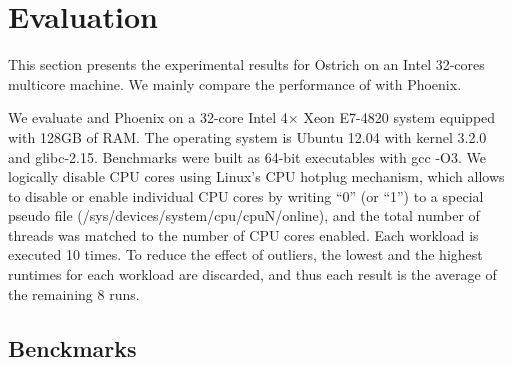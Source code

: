 \section{Evaluation}
This section presents the experimental results for Ostrich on an Intel 32-cores multicore machine. 
We mainly compare the performance of \myds with Phoenix.

We evaluate \myds and Phoenix on a 32-core Intel 4× Xeon E7-4820 system equipped with 128GB of RAM. 
The operating system is Ubuntu 12.04 with kernel 3.2.0 and glibc-2.15.
Benchmarks were built as 64-bit executables with gcc -O3.
We logically disable CPU cores using Linux’s CPU hotplug mechanism, which allows to disable or enable individual CPU cores by writing “0” (or “1”) to a special pseudo file (/sys/devices/system/cpu/cpuN/online), and the total number of threads was matched to the number of CPU cores enabled.
Each workload is executed 10 times. 
To reduce the effect of outliers, the lowest and the highest runtimes for each workload are discarded, and thus each result is the average of the remaining 8 runs.

\subsection{Benckmarks}
